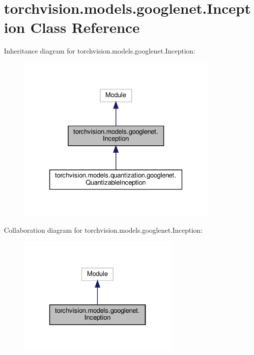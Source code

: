 \hypertarget{classtorchvision_1_1models_1_1googlenet_1_1Inception}{}\section{torchvision.\+models.\+googlenet.\+Inception Class Reference}
\label{classtorchvision_1_1models_1_1googlenet_1_1Inception}


Inheritance diagram for torchvision.\+models.\+googlenet.\+Inception\+:
\nopagebreak
\begin{figure}[H]
\begin{center}
\leavevmode
\includegraphics[width=282pt]{classtorchvision_1_1models_1_1googlenet_1_1Inception__inherit__graph}
\end{center}
\end{figure}


Collaboration diagram for torchvision.\+models.\+googlenet.\+Inception\+:
\nopagebreak
\begin{figure}[H]
\begin{center}
\leavevmode
\includegraphics[width=226pt]{classtorchvision_1_1models_1_1googlenet_1_1Inception__coll__graph}
\end{center}
\end{figure}
